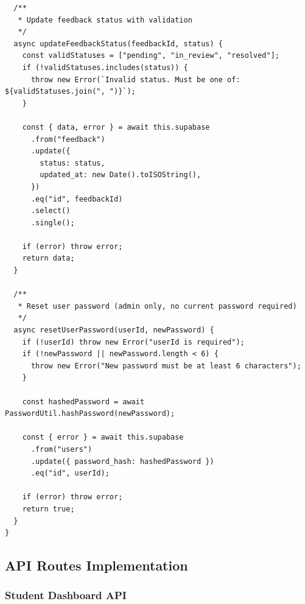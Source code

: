 \documentclass[12pt,a4paper]{article}
\begin{document}
\begin{verbatim}
  /**
   * Update feedback status with validation
   */
  async updateFeedbackStatus(feedbackId, status) {
    const validStatuses = ["pending", "in_review", "resolved"];
    if (!validStatuses.includes(status)) {
      throw new Error(`Invalid status. Must be one of: ${validStatuses.join(", ")}`);
    }

    const { data, error } = await this.supabase
      .from("feedback")
      .update({
        status: status,
        updated_at: new Date().toISOString(),
      })
      .eq("id", feedbackId)
      .select()
      .single();

    if (error) throw error;
    return data;
  }

  /**
   * Reset user password (admin only, no current password required)
   */
  async resetUserPassword(userId, newPassword) {
    if (!userId) throw new Error("userId is required");
    if (!newPassword || newPassword.length < 6) {
      throw new Error("New password must be at least 6 characters");
    }

    const hashedPassword = await PasswordUtil.hashPassword(newPassword);

    const { error } = await this.supabase
      .from("users")
      .update({ password_hash: hashedPassword })
      .eq("id", userId);

    if (error) throw error;
    return true;
  }
}
\end{verbatim}

\subsection{API Routes Implementation}

\subsubsection{Student Dashboard API}
\end{document}
